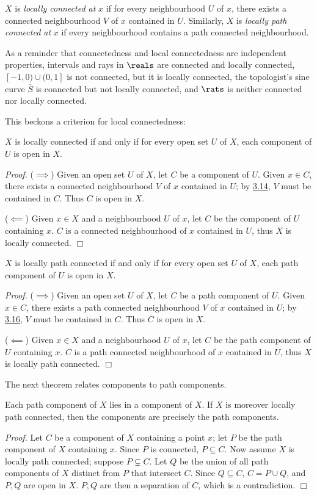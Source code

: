 \begin{definition}\label{3.17}
    $X$ is {\it locally connected at} $x$ if for every neighbourhood $U$ of $x$, there exists a connected neighbourhood $V$ of $x$ contained in $U$. Similarly, $X$ is {\it locally path connected at} $x$ if every neighbourhood contains a path connected neighbourhood.
\end{definition}

As a reminder that connectedness and local connectedness are independent properties, intervals and rays in $\reals$ are connected and locally connected, $[-1, 0) \cup (0, 1]$ is not connected, but it is locally connected, the topologist's sine curve $\overline{S}$ is connected but not locally connected, and $\rats$ is neither connected nor locally connected.

This beckons a criterion for local connectedness:
\begin{theorem}\label{3.18}
    $X$ is locally connected if and only if for every open set $U$ of $X$, each component of $U$ is open in $X$.
\end{theorem}
{\it Proof.} ($\implies$) Given an open set $U$ of $X$, let $C$ be a component of $U$. Given $x \in C$, there exists a connected neighbourhood $V$ of $x$ contained in $U$; by \hyperref[3.14]{3.14}, $V$ must be contained in $C$. Thus $C$ is open in $X$.

($\impliedby$) Given $x \in X$ and a neighbourhood $U$ of $x$, let $C$ be the component of $U$ containing $x$. $C$ is a connected neighbourhood of $x$ contained in $U$, thus $X$ is locally connected. $\Box$

\begin{theorem}\label{3.19}
    $X$ is locally path connected if and only if for every open set $U$ of $X$, each path component of $U$ is open in $X$.
\end{theorem}
{\it Proof.} ($\implies$) Given an open set $U$ of $X$, let $C$ be a path component of $U$. Given $x \in C$, there exists a path connected neighbourhood $V$ of $x$ contained in $U$; by \hyperref[3.16]{3.16}, $V$ must be contained in $C$. Thus $C$ is open in $X$.

($\impliedby$) Given $x \in X$ and a neighbourhood $U$ of $x$, let $C$ be the path component of $U$ containing $x$. $C$ is a path connected neighbourhood of $x$ contained in $U$, thus $X$ is locally path connected. $\Box$

The next theorem relates components to path components.
\begin{theorem}\label{3.20}
    Each path component of $X$ lies in a component of $X$. If $X$ is moreover locally path connected, then the components are precisely the path components.
\end{theorem}
{\it Proof.} Let $C$ be a component of $X$ containing a point $x$; let $P$ be the path component of $X$ containing $x$. Since $P$ is connected, $P \subseteq C$. Now assume $X$ is locally path connected; suppose $P \subsetneq C$. Let $Q$ be the union of all path components of $X$ distinct from $P$ that intersect $C$. Since $Q \subseteq C$, $C = P \cup Q$, and $P, Q$ are open in $X$. $P, Q$ are then a separation of $C$, which is a contradiction. $\Box$

